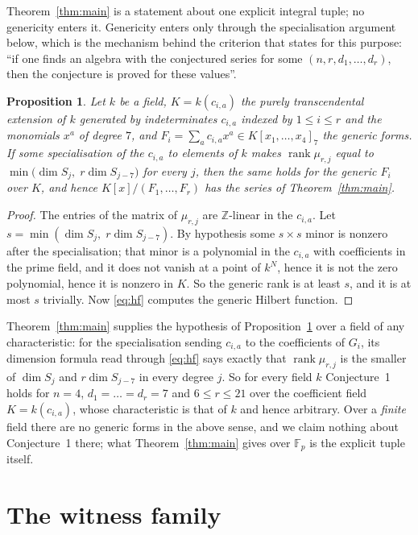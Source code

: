 \documentclass[11pt]{amsart}
\newtheorem{proposition}[theorem]{Proposition}
\theoremstyle{remark}
\DeclareMathOperator{\rank}{rank}
\newcommand{\ZZ}{\mathbb Z}
\newcommand{\FF}{\mathbb F}
\begin{document}
Theorem~\ref{thm:main} is a statement about one explicit integral tuple; no
genericity enters it. Genericity enters only through the specialisation argument
below, which is the mechanism behind the criterion that \cite[p.~416]{FL} states
for this purpose: ``if one finds an algebra with the conjectured series for some
$(n,r,d_1,\dots,d_r)$, then the conjecture is proved for these values''.

\begin{proposition}\label{prop:generic}
Let $k$ be a field, $K=k(c_{i,a})$ the purely transcendental extension of $k$
generated by indeterminates $c_{i,a}$ indexed by $1\le i\le r$ and the
monomials $x^a$ of degree $7$, and $F_i=\sum_a c_{i,a}x^a\in K[x_1,\dots,x_4]_7$
the generic forms. If some specialisation of the $c_{i,a}$ to elements of $k$
makes $\rank\mu_{r,j}$ equal to $\min\bigl(\dim S_j,\;r\dim S_{j-7}\bigr)$ for
every $j$, then the same holds for the generic $F_i$ over $K$, and hence
$K[x]/(F_1,\dots,F_r)$ has the series of Theorem~\ref{thm:main}.
\end{proposition}

\begin{proof}
The entries of the matrix of $\mu_{r,j}$ are $\ZZ$-linear in the $c_{i,a}$. Let
$s=\min(\dim S_j,\;r\dim S_{j-7})$. By hypothesis some $s\times s$ minor is
nonzero after the specialisation; that minor is a polynomial in the $c_{i,a}$
with coefficients in the prime field, and it does not vanish at a point of
$k^N$, hence it is not the zero polynomial, hence it is nonzero in $K$. So the
generic rank is at least $s$, and it is at most $s$ trivially. Now
\eqref{eq:hf} computes the generic Hilbert function.
\end{proof}

Theorem~\ref{thm:main} supplies the hypothesis of
Proposition~\ref{prop:generic} over a field of any characteristic: for the
specialisation sending $c_{i,a}$ to the coefficients of $G_i$, its dimension
formula read through \eqref{eq:hf} says exactly that $\rank\mu_{r,j}$ is the
smaller of $\dim S_j$ and $r\dim S_{j-7}$ in every degree $j$. So for every
field $k$ Conjecture~1 holds for $n=4$, $d_1=\dots=d_r=7$ and $6\le r\le21$ over
the coefficient field $K=k(c_{i,a})$, whose characteristic is that of $k$ and
hence arbitrary. Over a \emph{finite} field there are no generic forms in the
above sense, and we claim nothing about Conjecture~1 there; what
Theorem~\ref{thm:main} gives over $\FF_p$ is the explicit tuple itself.

\section{The witness family}\label{sec:family}
\end{document}
